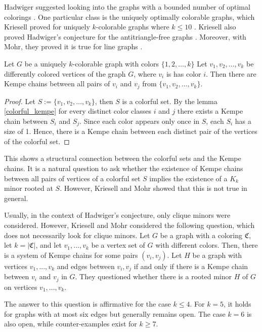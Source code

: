     Hadwiger suggested looking into the graphs with a bounded number of optimal colorings \cite{hadwiger_1943}.
    One particular class is the uniquely optimally colorable graphs,
    which Kriesell proved for uniquely $k$-colorable graphs where $k \leq 10$ \cite{Kriesell2021}.
    Kriesell also proved Hadwiger's conjecture for the antitriangle-free graphs \cite{Kriesell2017}.
    Moreover, with Mohr, they proved it is true for line graphs \cite{Kriesell2019}.

    \begin{claim}
 Let $G$ be a uniquely $k$-colorable graph with colors $\{1, 2, \dots, k\}$ Let $v_1, v_2, \dots, v_k$ be differently colored vertices of the graph $G$, 
 where $v_i$ is has color $i$.
 Then there are Kempe chains between all pairs of $v_i$ and $v_j$ from $\{v_1, v_2, \dots, v_k\}$.
    \end{claim}
    
    
    \begin{proof}
 Let $S := \{v_1, v_2, \dots, v_k\}$, then $S$ is a colorful set. By the lemma \ref{colorful_kempe} for every distinct color classes
        $i$ and $j$ there exists a Kempe chain between $S_i$ and $S_j$. Since each color appears only once in $S$, 
 each $S_i$ has a size of 1. Hence, there is a Kempe chain between each distinct pair of the vertices of the colorful set.
    \end{proof}

This shows a structural connection between the colorful sets and the Kempe chains. 
It is a natural question to ask whether the existence of Kempe chains
between all pairs of vertices of a colorful set $S$ implies the existence of a $K_k$ minor rooted at $S$.
However, Kriesell and Mohr \cite{matthias_2022} showed that this is not true in general.

Usually, in the context of Hadwiger's conjecture, only clique minors were considered. However, Kriesell and Mohr \cite{matthias_2022} considered
the following question, which does not necessarily look for clique minors. Let $G$ be a graph with a coloring
$\mathfrak{C}$, let $k = |\mathfrak{C}|$, and let $v_1, ..., v_{k}$ be a vertex set of $G$ with different colors.
Then, there is a system of Kempe chains for some pairs $(v_i, v_j)$.
Let $H$ be a graph with vertices $v_1, ..., v_{k}$ and edges between $v_i, v_j$ if and only if there is a Kempe chain between $v_i$ and $v_j$ in $G$.
They questioned whether there is a rooted minor $H$ of $G$ on vertices $v_1, ..., v_{k}$.

The answer to this question is affirmative for the case $k \leq 4$. For $k = 5$,
it holds for graphs with at most six edges but generally remains open.
The case $k = 6$ is also open, while counter-examples exist for $k \geq 7$.

